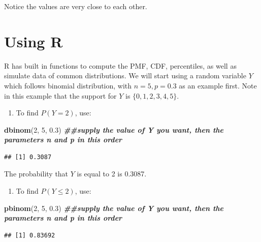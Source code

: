 \documentclass[
]{book}
\newenvironment{Shaded}{\begin{snugshade}}{\end{snugshade}}
\newcommand{\DecValTok}[1]{\textcolor[rgb]{0.00,0.00,0.81}{#1}}
\newcommand{\DocumentationTok}[1]{\textcolor[rgb]{0.56,0.35,0.01}{\textbf{\textit{#1}}}}
\newcommand{\FloatTok}[1]{\textcolor[rgb]{0.00,0.00,0.81}{#1}}
\newcommand{\FunctionTok}[1]{\textcolor[rgb]{0.13,0.29,0.53}{\textbf{#1}}}
\newcommand{\NormalTok}[1]{#1}
\providecommand{\tightlist}{%
  \setlength{\itemsep}{0pt}\setlength{\parskip}{0pt}}
\begin{document}
Notice the values are very close to each other.

\section{Using R}\label{Rdis}

R has built in functions to compute the PMF, CDF, percentiles, as well as simulate data of common distributions. We will start using a random variable \(Y\) which follows binomial distribution, with \(n=5, p = 0.3\) as an example first. Note in this example that the support for \(Y\) is \(\{0,1,2,3,4,5 \}\).

\begin{enumerate}
\def\labelenumi{\arabic{enumi}.}
\tightlist
\item
  To find \(P(Y=2)\), use:
\end{enumerate}

\begin{Shaded}
\begin{Highlighting}[]
\FunctionTok{dbinom}\NormalTok{(}\DecValTok{2}\NormalTok{, }\DecValTok{5}\NormalTok{, }\FloatTok{0.3}\NormalTok{) }\DocumentationTok{\#\#supply the value of Y you want, then the parameters n and p in this order}
\end{Highlighting}
\end{Shaded}

\begin{verbatim}
## [1] 0.3087
\end{verbatim}

The probability that \(Y\) is equal to 2 is 0.3087.

\begin{enumerate}
\def\labelenumi{\arabic{enumi}.}
\setcounter{enumi}{1}
\tightlist
\item
  To find \(P(Y \leq 2)\), use:
\end{enumerate}

\begin{Shaded}
\begin{Highlighting}[]
\FunctionTok{pbinom}\NormalTok{(}\DecValTok{2}\NormalTok{, }\DecValTok{5}\NormalTok{, }\FloatTok{0.3}\NormalTok{) }\DocumentationTok{\#\#supply the value of Y you want, then the parameters n and p in this order}
\end{Highlighting}
\end{Shaded}

\begin{verbatim}
## [1] 0.83692
\end{verbatim}
\end{document}
